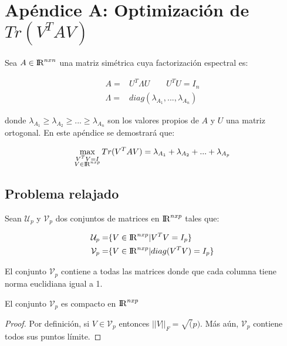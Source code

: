 \chapter{Apéndice A: Optimización de $Tr(V^TA V)$}
\label{ch:appendixA}


Sea $A \in {\rm I\!R}^{nxn}$ una matriz simétrica cuya factorización espectral es:

\begin{equation*}
\begin{aligned}
	A =& U^T \Lambda U \qquad U^T U = I_n\\
	\Lambda =& diag(\lambda_{A_1}, ..., \lambda_{A_n} )
\end{aligned}
\end{equation*}

donde $\lambda_{A_1} \geq \lambda_{A_2} \geq ... \geq \lambda_{A_n}$ son los valores propios de $A$ y $U$ una matriz ortogonal. En este apéndice se demostrará que:

\begin{equation}\label{A1:1}
\begin{aligned}
\max_{\substack{V^T V = I \\V \in {\rm I\!R}^{nxp} }}Tr(V^T A V) = \lambda_{A_1} + \lambda_{A_2} + ... + \lambda_{A_p}
\end{aligned}
\end{equation}

\section{Problema relajado}
Sean $\mathcal{U}_p$ y $\mathcal{V}_p$ dos conjuntos de matrices en ${\rm I\!R}^{nxp}$ tales que:

\begin{equation*}
\begin{aligned}
\mathcal{U}_p =& \{V \in {\rm I\!R}^{nxp} | V^TV = I_p\}	\\
\mathcal{V}_p =& \{V \in {\rm I\!R}^{nxp} | diag(V^TV) = I_p\}	
\end{aligned}
\end{equation*}

El conjunto $\mathcal{V}_p$ contiene a todas las matrices donde que cada columna tiene norma euclidiana igual a 1.

\begin{lemma}
El conjunto $\mathcal{V}_p$ es compacto en ${\rm I\!R}^{nxp}$
\begin{proof}
Por definición, si $V \in \mathcal{V}_p$ entonces $||V||_F = \sqrt(p)$.
Más aún, $\mathcal{V}_p$ contiene todos sus puntos límite.
\end{proof}
\end{lemma}

